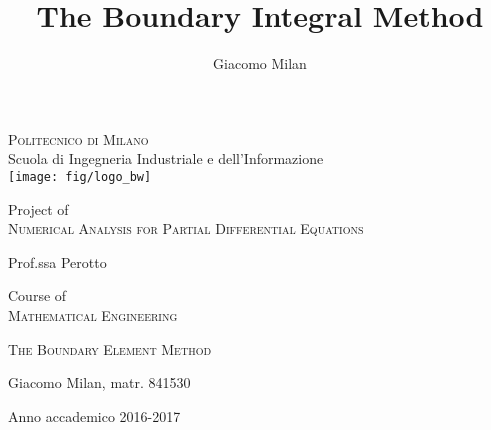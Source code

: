 \documentclass[10pt, a4paper]{article} %
\title{The Boundary Integral Method}
\author{Giacomo Milan}
\numberwithin{equation}{section}
\theoremstyle{definition}
\theoremstyle{plain}
\theoremstyle{plain}
\theoremstyle{plain}
\theoremstyle{plain}
\theoremstyle{plain}
\theoremstyle{plain}
\theoremstyle{plain}
\theoremstyle{plain}
\begin{document}
\begin{titlepage}
    \begin{center}
        \Large
        \vspace*{1cm}
        \textsc{Politecnico di Milano}\\
        Scuola di Ingegneria Industriale e dell'Informazione\\
        \vspace{1cm}
        \texttt{[image: fig/logo\_bw]}
        
        \normalsize
        \vspace{1cm}
        Project of \\
        \large
        \textsc{Numerical Analysis for Partial Differential Equations}\\
        \begin{flushright}
        \normalsize
         Prof.ssa Perotto
        \end{flushright}
        \normalsize
        Course of \\
        \large
        \textsc{Mathematical Engineering}
        

        \vspace{0.8cm}
        \huge
        \textsc{The Boundary Element Method}
        
        
        \vspace{1.5cm}
        \begin{flushright}
        \normalsize
        {Giacomo Milan, matr. 841530}         
        \end{flushright}
        \normalsize
        \vfill
        Anno accademico 2016-2017
        
    \end{center}
\end{titlepage}
\newpage
\thispagestyle{empty}
\mbox{}
\newpage
\tableofcontents
\clearpage
\end{document}
